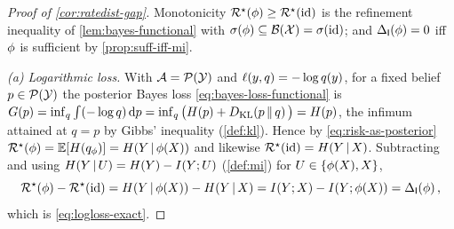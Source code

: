 \begin{proof}[Proof of \cref{cor:ratedist-gap}]
Monotonicity $\mathcal{R}^{\star}(\phi)\ge\mathcal{R}^{\star}(\mathrm{id})$ is the refinement
inequality of \cref{lem:bayes-functional} with
$\sigma\!\left(\phi\right)\subseteq\mathcal{B}(\mathcal{X})=\sigma\!\left(\mathrm{id}\right)$; and
$\Delta_{\mathsf{I}}\!\left(\phi\right)=0$ iff $\phi$ is sufficient by \cref{prop:suff-iff-mi}.

\emph{(a) Logarithmic loss.} With $\mathcal{A}=\mathcal{P}(\mathcal{Y})$ and
$\ell(y,q)=-\log q(y)$, for a fixed belief $p\in\mathcal{P}(\mathcal{Y})$ the
posterior Bayes loss \eqref{eq:bayes-loss-functional} is
$G(p)=\inf_{q}\int(-\log q)\,\mathrm{d}p
=\inf_{q}\big(H(p)+D_{\mathrm{KL}}\!\left(p \,\Vert\, q\right)\big)=H(p)$, the infimum attained at $q=p$ by
Gibbs' inequality (\cref{def:kl}). Hence by \eqref{eq:risk-as-posterior}
$\mathcal{R}^{\star}(\phi)=\mathbb{E}[H(q_{\phi})]=H(Y \,\vert\, \phi(X))$ and likewise
$\mathcal{R}^{\star}(\mathrm{id})=H(Y \,\vert\, X)$. Subtracting and using
$H(Y \,\vert\, U)=H(Y)-I(Y ; U)$ (\cref{def:mi}) for $U\in\{\phi(X),X\}$,
\[
  \mathcal{R}^{\star}(\phi)-\mathcal{R}^{\star}(\mathrm{id})
  = H(Y \,\vert\, \phi(X))-H(Y \,\vert\, X)
  = I(Y ; X)-I(Y ; \phi(X))
  = \Delta_{\mathsf{I}}\!\left(\phi\right),
\]
which is \eqref{eq:logloss-exact}.


\end{proof}
